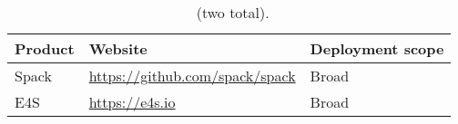 \begin{table}[H]
\centering
\begin{tabularx}{\textwidth}{|l|X|l|}\hline
		\rowcolor{LightCyan}
	\textbf{Product} & \textbf{Website} & \textbf{Deployment scope}\\\hline
	Spack & \url{https://github.com/spack/spack} & Broad\\\hline
	E4S & \url{https://e4s.io} & Broad\\\hline

\end{tabularx}
\caption{\label{table:eco-products} \ecosystem~(two total).}
\end{table}
